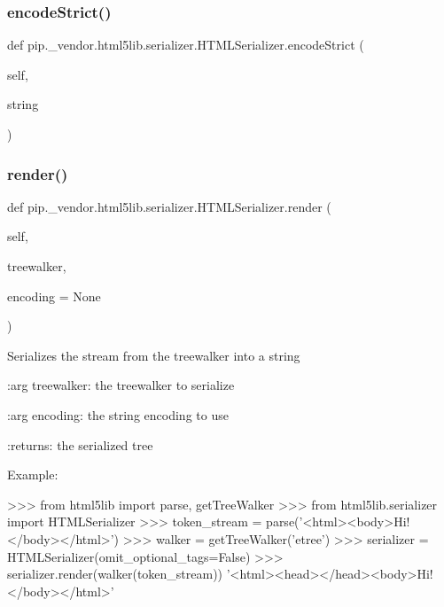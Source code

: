 \subsubsection{\texorpdfstring{encode\+Strict()}{encodeStrict()}}
{\footnotesize\ttfamily def pip.\+\_\+vendor.\+html5lib.\+serializer.\+H\+T\+M\+L\+Serializer.\+encode\+Strict (\begin{DoxyParamCaption}\item[{}]{self,  }\item[{}]{string }\end{DoxyParamCaption})}

\mbox{\label{classpip_1_1__vendor_1_1html5lib_1_1serializer_1_1HTMLSerializer_a24277c42df8722ba57624ed6dcedc6ea}} 
\subsubsection{\texorpdfstring{render()}{render()}}
{\footnotesize\ttfamily def pip.\+\_\+vendor.\+html5lib.\+serializer.\+H\+T\+M\+L\+Serializer.\+render (\begin{DoxyParamCaption}\item[{}]{self,  }\item[{}]{treewalker,  }\item[{}]{encoding = {\ttfamily None} }\end{DoxyParamCaption})}

\begin{DoxyVerb}Serializes the stream from the treewalker into a string

:arg treewalker: the treewalker to serialize

:arg encoding: the string encoding to use

:returns: the serialized tree

Example:

>>> from html5lib import parse, getTreeWalker
>>> from html5lib.serializer import HTMLSerializer
>>> token_stream = parse('<html><body>Hi!</body></html>')
>>> walker = getTreeWalker('etree')
>>> serializer = HTMLSerializer(omit_optional_tags=False)
>>> serializer.render(walker(token_stream))
'<html><head></head><body>Hi!</body></html>'\end{DoxyVerb}
 \mbox{\label{classpip_1_1__vendor_1_1html5lib_1_1serializer_1_1HTMLSerializer_a307cfabfce14ef279b3aba85ea81d4d7}} 
